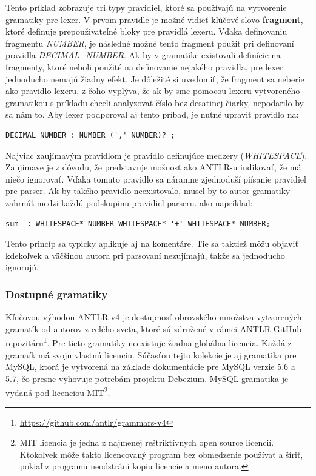 Tento príklad zobrazuje tri typy pravidiel, ktoré sa používajú na vytvorenie gramatiky pre lexer. V prvom pravidle je možné vidieť kľúčové slovo \textbf{fragment}, ktoré definuje prepouživateľné bloky pre pravidlá lexeru. Vďaka definovaniu fragmentu \textit{NUMBER}, je následné možné tento fragment použiť pri definovaní pravidla \textit{DECIMAL\_NUMBER}. Ak by v gramatike existovali definície na fragmenty, ktoré neboli použité na definovanie nejakého pravidla, pre lexer jednoducho nemajú žiadny efekt. Je dôležité si uvedomiť, že fragment sa neberie ako pravidlo lexeru, z čoho vyplýva, že ak by sme pomocou lexeru vytvoreného gramatikou s príkladu chceli analyzovať číslo bez desatinej čiarky, nepodarilo by sa nám to. Aby lexer podporoval aj tento príbad, je nutné upraviť pravidlo na:

\begin{lstlisting}[basicstyle=\small]
DECIMAL_NUMBER : NUMBER (',' NUMBER)? ;
\end{lstlisting}

Najviac zaujímavým pravidlom je pravidlo definujúce medzery (\textit{WHITESPACE}). Zaujímave je z dôvodu, že predstavuje možnosť ako ANTLR-u indikovať, že má niečo ignorovať. Vďaka tomuto pravidlo sa náramne zjednoduší piísanie pravidiel pre parser. Ak by takého pravidlo neexistovalo, musel by to autor gramatiky zahrnúť medzi každú podskupinu pravidiel parseru. ako napríklad:
\begin{lstlisting}[basicstyle=\small]
sum  : WHITESPACE* NUMBER WHITESPACE* '+' WHITESPACE* NUMBER;
\end{lstlisting}

Tento princíp sa typicky aplikuje aj na komentáre. Tie sa taktiež môžu objaviť kdekoľvek a väčšinou autora pri parsovaní nezujímajú, takže sa jednoducho ignorujú.

\subsubsection{Dostupné gramatiky}
Kľučovou výhodou ANTLR v4 je dostupnosť obrovského množstva vytvorených gramatík od autorov z celého sveta, ktoré sú združené v rámci ANTLR GitHub repozitáru\footnote{\url{https://github.com/antlr/grammars-v4}}. Pre tieto gramatiky neexistuje žiadna globálna licencia. Každá z gramaík má svoju vlastnú licenciu. Súčasťou tejto kolekcie je aj gramatika pre MySQL, ktorá je vytvorená na základe dokumentácie pre MySQL verzie 5.6 a 5.7, čo presne vyhovuje potrebám projektu Debezium. MySQL gramatika je vydaná pod licenciou MIT\footnote{MIT licencia je jedna z najmenej reštriktívnych open source licencií. Ktokoľvek môže takto licencovaný program bez obmedzenie používať a šíriť, pokiaľ z programu neodstráni kopiu licencie a meno autora.}.

